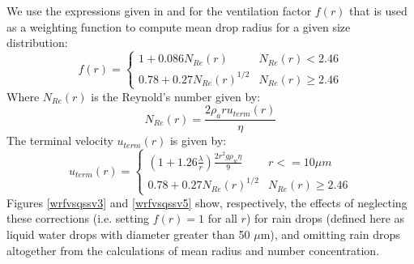 \documentclass{article}
\begin{document}
We use the expressions given in \cite{Pruppacher2010} and \cite{Rogers1989} for the ventilation factor $f(r)$ that is used as a weighting function to compute mean drop radius for a given size distribution:
\[ f(r) =  
  \begin{cases} 
      1 + 0.086N_{Re}(r) & N_{Re}(r) < 2.46 \\
      0.78 + 0.27N_{Re}(r)^{1/2} & N_{Re}(r) \geq 2.46
   \end{cases}
\]
Where $N_{Re}(r)$ is the Reynold's number given by:
\begin{equation}
N_{Re}(r) = \frac{2 \rho_{a} r u_{term}(r)}{\eta}
\end{equation}
The terminal velocity $u_{term}(r)$ is given by:
\[ u_{term}(r) =  
  \begin{cases} 
      (1 + 1.26\frac{\lambda}{r})\frac{2r^2g\rho_w\eta}{9} & r <= 10 \mu m \\
      0.78 + 0.27N_{Re}(r)^{1/2} & N_{Re}(r) \geq 2.46
   \end{cases}
\]
Figures \ref{wrfvsqssv3} and \ref{wrfvsqssv5} show, respectively, the effects of neglecting these corrections (i.e. setting $f(r)=1$ for all $r$) for rain drops (defined here as liquid water drops with diameter greater than 50 $\mu$m), and omitting rain drops altogether from the calculations of mean radius and number concentration.
\end{document}
